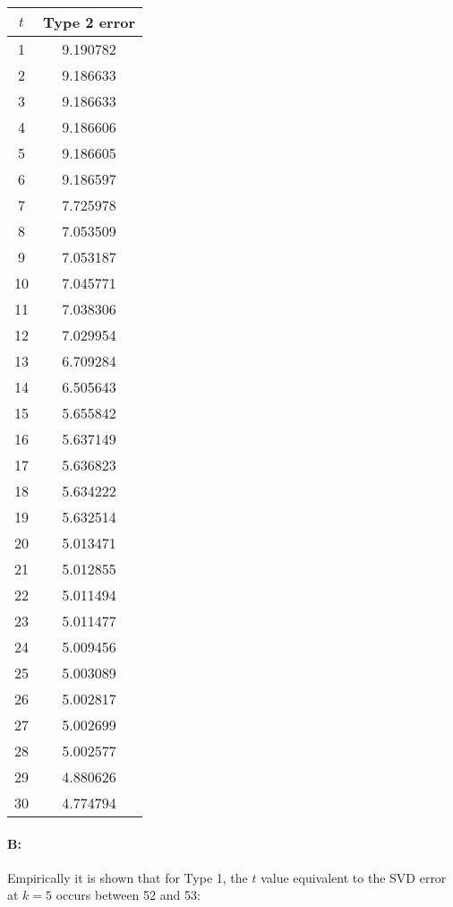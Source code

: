\documentclass[11pt]{article}
\begin{document}
\begin{tabular}{ | c | c | }
  \hline
  $t$ & Type 2 error \\
  \hline
  \hline
  1 & 9.190782 \\ 
  \hline
  2 & 9.186633 \\ 
  \hline
  3 & 9.186633 \\ 
  \hline
  4 & 9.186606 \\ 
  \hline
  5 & 9.186605 \\ 
  \hline
  6 & 9.186597 \\ 
  \hline
  7 & 7.725978 \\ 
  \hline
  8 & 7.053509 \\ 
  \hline
  9 & 7.053187 \\ 
  \hline
  10 & 7.045771 \\ 
  \hline
  11 & 7.038306 \\ 
  \hline
  12 & 7.029954 \\ 
  \hline
  13 & 6.709284 \\ 
  \hline
  14 & 6.505643 \\ 
  \hline
  15 & 5.655842 \\ 
  \hline
  16 & 5.637149 \\ 
  \hline
  17 & 5.636823 \\ 
  \hline
  18 & 5.634222 \\ 
  \hline
  19 & 5.632514 \\ 
  \hline
  20 & 5.013471 \\ 
  \hline
  21 & 5.012855 \\ 
  \hline
  22 & 5.011494 \\ 
  \hline
  23 & 5.011477 \\ 
  \hline
  24 & 5.009456 \\ 
  \hline
  25 & 5.003089 \\ 
  \hline
  26 & 5.002817 \\ 
  \hline
  27 & 5.002699 \\ 
  \hline
  28 & 5.002577 \\ 
  \hline
  29 & 4.880626 \\ 
  \hline
  30 & 4.774794 \\ 
  \hline
\end{tabular}

\paragraph{B:} Empirically it is shown that for Type 1, the $t$ value equivalent to the SVD error at $k = 5$ occurs between 52 and 53: \\
\end{document}
